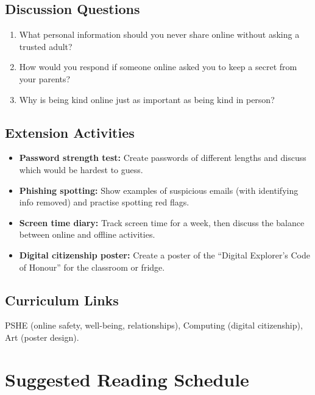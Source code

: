 \subsection*{Discussion Questions}
\begin{enumerate}
  \item What personal information should you never share online without asking a trusted adult?
  \item How would you respond if someone online asked you to keep a secret from your parents?
  \item Why is being kind online just as important as being kind in person?
\end{enumerate}

\subsection*{Extension Activities}
\begin{itemize}
  \item \textbf{Password strength test:} Create passwords of different lengths and discuss which would be hardest to guess.
  \item \textbf{Phishing spotting:} Show examples of suspicious emails (with identifying info removed) and practise spotting red flags.
  \item \textbf{Screen time diary:} Track screen time for a week, then discuss the balance between online and offline activities.
  \item \textbf{Digital citizenship poster:} Create a poster of the ``Digital Explorer's Code of Honour'' for the classroom or fridge.
\end{itemize}

\subsection*{Curriculum Links}
PSHE (online safety, well-being, relationships), Computing (digital citizenship), Art (poster design).

\sectionrule

\section*{Suggested Reading Schedule}


